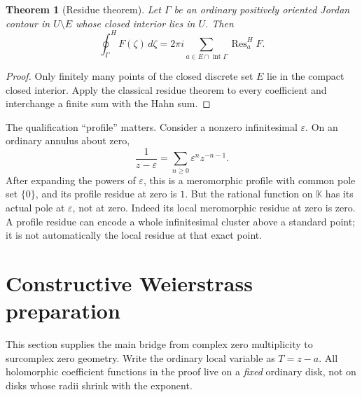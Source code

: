 \documentclass[11pt,a4paper]{article}
\numberwithin{equation}{section}
\newtheorem{theorem}{Theorem}[section]
\theoremstyle{definition}
\newcommand{\K}{\mathbb K}
\newcommand{\Res}{\operatorname{Res}}
\newcommand{\hoint}{\oint^{\!H}}
\begin{document}
\begin{theorem}[Residue theorem]\label{thm:residue}
Let $\Gamma$ be an ordinary positively oriented Jordan contour in $U\setminus E$
whose closed interior lies in $U$. Then
\begin{equation}\label{eq:residue}
 \hoint_\Gamma F(\zeta)\,d\zeta
   =2\pi i\sum_{a\in E\cap\operatorname{int}\Gamma}\Res^H_a F.
\end{equation}
\end{theorem}
\begin{proof}
Only finitely many points of the closed discrete set $E$ lie in the compact
closed interior. Apply the classical residue theorem to every coefficient
and interchange a finite sum with the Hahn sum.
\end{proof}

The qualification ``profile'' matters. Consider a nonzero infinitesimal
$\varepsilon$. On an ordinary annulus about zero,
\begin{equation}\label{eq:movingpole}
 \frac1{z-\varepsilon}
   =\sum_{n\geq0}\varepsilon^n z^{-n-1}.
\end{equation}
After expanding the powers of $\varepsilon$, this is a meromorphic profile
with common pole set $\{0\}$, and its profile residue at zero is $1$.
But the rational function on $\K$ has its actual pole at $\varepsilon$, not
at zero. Indeed its local meromorphic residue at zero is zero. A profile
residue can encode a whole infinitesimal cluster above a standard point;
it is not automatically the local residue at that exact point.

\section{Constructive Weierstrass preparation}

This section supplies the main bridge from complex zero multiplicity to
surcomplex zero geometry. Write the ordinary local variable as $T=z-a$.
All holomorphic coefficient functions in the proof live on a \emph{fixed}
ordinary disk, not on disks whose radii shrink with the exponent.
\end{document}
